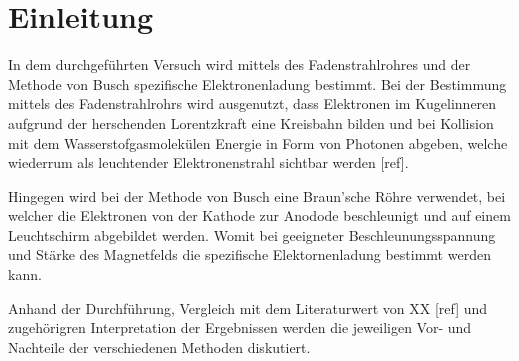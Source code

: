 \chapter{Einleitung}
In dem durchgeführten Versuch wird mittels des Fadenstrahlrohres und der Methode von Busch spezifische Elektronenladung bestimmt. Bei der Bestimmung mittels des Fadenstrahlrohrs wird ausgenutzt, dass Elektronen im Kugelinneren aufgrund der herschenden Lorentzkraft eine Kreisbahn bilden und bei Kollision mit dem Wasserstofgasmolekülen Energie in Form von Photonen abgeben, welche wiederrum als leuchtender Elektronenstrahl sichtbar werden [ref].

Hingegen wird bei der Methode von Busch eine Braun'sche Röhre verwendet, bei welcher die Elektronen von der Kathode zur Anodode beschleunigt und auf einem Leuchtschirm abgebildet werden. Womit bei geeigneter Beschleunungsspannung und Stärke des Magnetfelds die spezifische Elektornenladung bestimmt werden kann.

Anhand der Durchführung, Vergleich mit dem Literaturwert von XX [ref] und zugehörigren Interpretation der Ergebnissen werden die jeweiligen Vor- und Nachteile der verschiedenen Methoden diskutiert.
